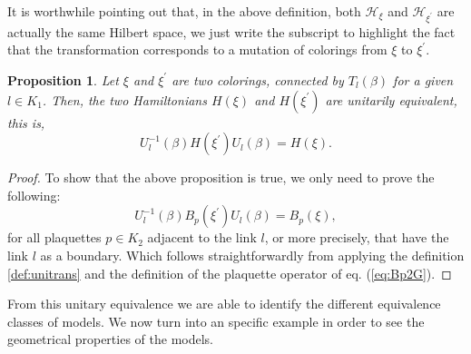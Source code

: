 \documentclass[%
nofootinbib,
 amsmath,amssymb,
aps,
]{revtex4-1}
\theoremstyle{plain}%
\newtheorem{prop}[thm]{Proposition}
\theoremstyle{definition}
\theoremstyle{remark}
\begin{document}
It is worthwhile pointing out that, in the above definition, both $\mathcal{H}_\xi$ and $\mathcal{H}_{\xi^{\prime}}$ are actually the same Hilbert space, we just write the subscript to highlight the fact that the transformation corresponds to a mutation of colorings from $\xi$ to $\xi^{\prime}$. 
\begin{prop} Let $\xi$ and $\xi^{\prime}$ are two colorings, connected by $T_l(\beta)$ for a given $l \in K_1$. Then, the two Hamiltonians $H(\xi)$ and $H(\xi^{\prime})$ are unitarily equivalent, this is,
\[U_l^{-1}(\beta)H(\xi^{\prime})U_l(\beta) = H(\xi).\]
\end{prop}
\begin{proof}
To show that the above proposition is true, we only need to prove the following:
\[U_l^{-1}(\beta)B_p(\xi^{\prime})U_l(\beta) = B_p(\xi),\]
for all plaquettes $p \in K_2$ adjacent to the link $l$, or more precisely, that have the link $l$ as a boundary. Which follows straightforwardly from applying the definition \ref{def:unitrans} and the definition of the plaquette operator of eq. (\ref{eq:Bp2G}).
\end{proof}
From this unitary equivalence we are able to identify the different equivalence classes of models.
We now turn into an specific example in order to see the geometrical properties of the models. 
\end{document}
